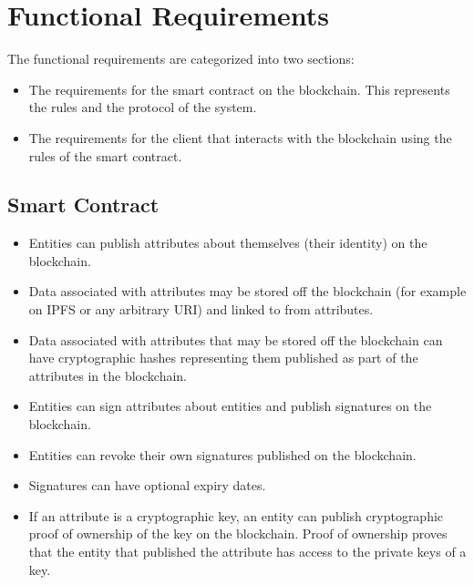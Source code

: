 \documentclass[12pt,a4paper]{report}
\begin{document}
	\section{Functional Requirements}
	The functional requirements are categorized into two sections:
	\begin{itemize}
		\item The requirements for the smart contract on the blockchain. This represents the rules and the protocol of the system.
		\item The requirements for the client that interacts with the blockchain using the rules of the smart contract.
	\end{itemize}		
	
	\subsection{Smart Contract}
	\begin{itemize}
		\item Entities can publish attributes about themselves (their identity) on the blockchain.
		\item Data associated with attributes may be stored off the blockchain (for example on IPFS or any arbitrary URI) and linked to from attributes.
		\item Data associated with attributes that may be stored off the blockchain can have cryptographic hashes representing them published as part of the attributes in the blockchain.
		\item Entities can sign attributes about entities and publish signatures on the blockchain.
		\item Entities can revoke their own signatures published on the blockchain.
		\item Signatures can have optional expiry dates.
		\item If an attribute is a cryptographic key, an entity can publish cryptographic proof of ownership of the key on the blockchain. Proof of ownership proves that the entity that published the attribute has access to the private keys of a key.
	\end{itemize}
	
\end{document}
